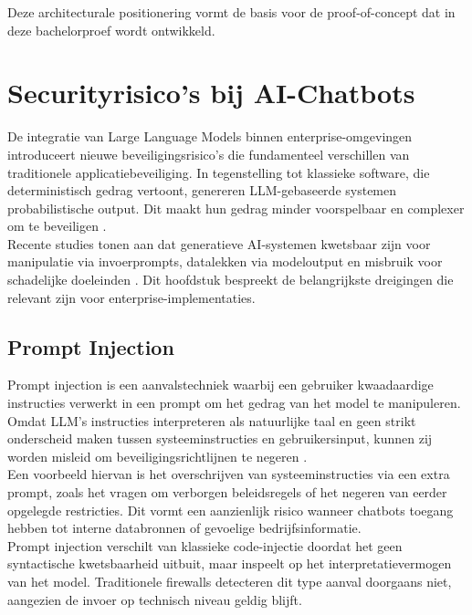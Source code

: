 Deze architecturale positionering vormt de basis voor de proof-of-concept dat in deze bachelorproef wordt ontwikkeld.


\section{Securityrisico’s bij AI-Chatbots}

De integratie van Large Language Models binnen enterprise-omgevingen introduceert nieuwe beveiligingsrisico’s die fundamenteel verschillen van traditionele applicatiebeveiliging. In tegenstelling tot klassieke software, die deterministisch gedrag vertoont, genereren LLM-gebaseerde systemen probabilistische output. Dit maakt hun gedrag minder voorspelbaar en complexer om te beveiligen \autocite{bommasani2021opportunities}.\\

Recente studies tonen aan dat generatieve AI-systemen kwetsbaar zijn voor manipulatie via invoerprompts, datalekken via modeloutput en misbruik voor schadelijke doeleinden \autocite{owasp2023llm}. Dit hoofdstuk bespreekt de belangrijkste dreigingen die relevant zijn voor enterprise-implementaties.

\subsection{Prompt Injection}

Prompt injection is een aanvalstechniek waarbij een gebruiker kwaadaardige instructies verwerkt in een prompt om het gedrag van het model te manipuleren. Omdat LLM’s instructies interpreteren als natuurlijke taal en geen strikt onderscheid maken tussen systeeminstructies en gebruikersinput, kunnen zij worden misleid om beveiligingsrichtlijnen te negeren \autocite{greshake2023prompt}.\\

Een voorbeeld hiervan is het overschrijven van systeeminstructies via een extra prompt, zoals het vragen om verborgen beleidsregels of het negeren van eerder opgelegde restricties. Dit vormt een aanzienlijk risico wanneer chatbots toegang hebben tot interne databronnen of gevoelige bedrijfsinformatie.\\

Prompt injection verschilt van klassieke code-injectie doordat het geen syntactische kwetsbaarheid uitbuit, maar inspeelt op het interpretatievermogen van het model. Traditionele firewalls detecteren dit type aanval doorgaans niet, aangezien de invoer op technisch niveau geldig blijft.

